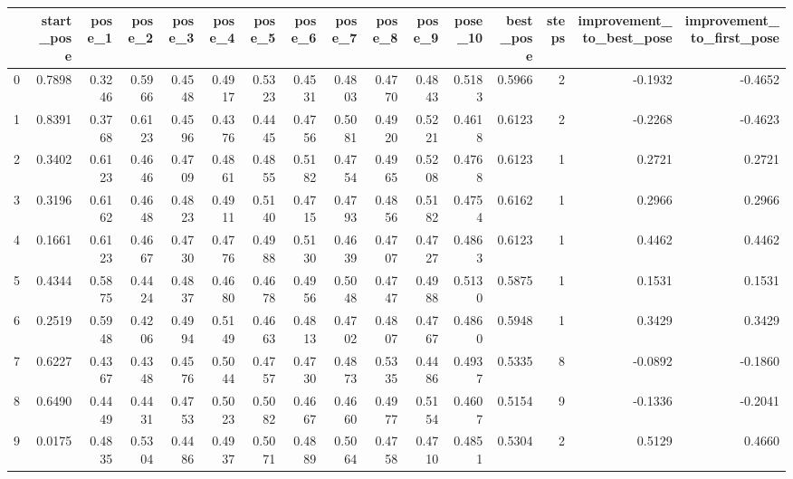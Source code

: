 \begin{tabular}{lrrrrrrrrrrrrrrr}
\toprule
{} &  start\_pose &  pose\_1 &  pose\_2 &  pose\_3 &  pose\_4 &  pose\_5 &  pose\_6 &  pose\_7 &  pose\_8 &  pose\_9 &  pose\_10 &  best\_pose &  steps &  improvement\_to\_best\_pose &  improvement\_to\_first\_pose \\
\midrule
0   &      0.7898 &  0.3246 &  0.5966 &  0.4548 &  0.4917 &  0.5323 &  0.4531 &  0.4803 &  0.4770 &  0.4843 &   0.5183 &     0.5966 &      2 &                   -0.1932 &                    -0.4652 \\
1   &      0.8391 &  0.3768 &  0.6123 &  0.4596 &  0.4376 &  0.4445 &  0.4756 &  0.5081 &  0.4920 &  0.5221 &   0.4618 &     0.6123 &      2 &                   -0.2268 &                    -0.4623 \\
2   &      0.3402 &  0.6123 &  0.4646 &  0.4709 &  0.4861 &  0.4855 &  0.5182 &  0.4754 &  0.4965 &  0.5208 &   0.4768 &     0.6123 &      1 &                    0.2721 &                     0.2721 \\
3   &      0.3196 &  0.6162 &  0.4648 &  0.4823 &  0.4911 &  0.5140 &  0.4715 &  0.4793 &  0.4856 &  0.5182 &   0.4754 &     0.6162 &      1 &                    0.2966 &                     0.2966 \\
4   &      0.1661 &  0.6123 &  0.4667 &  0.4730 &  0.4776 &  0.4988 &  0.5130 &  0.4639 &  0.4707 &  0.4727 &   0.4863 &     0.6123 &      1 &                    0.4462 &                     0.4462 \\
5   &      0.4344 &  0.5875 &  0.4424 &  0.4837 &  0.4680 &  0.4678 &  0.4956 &  0.5048 &  0.4747 &  0.4988 &   0.5130 &     0.5875 &      1 &                    0.1531 &                     0.1531 \\
6   &      0.2519 &  0.5948 &  0.4206 &  0.4994 &  0.5149 &  0.4663 &  0.4813 &  0.4702 &  0.4807 &  0.4767 &   0.4860 &     0.5948 &      1 &                    0.3429 &                     0.3429 \\
7   &      0.6227 &  0.4367 &  0.4348 &  0.4576 &  0.5044 &  0.4757 &  0.4730 &  0.4873 &  0.5335 &  0.4486 &   0.4937 &     0.5335 &      8 &                   -0.0892 &                    -0.1860 \\
8   &      0.6490 &  0.4449 &  0.4431 &  0.4753 &  0.5023 &  0.5082 &  0.4667 &  0.4660 &  0.4977 &  0.5154 &   0.4607 &     0.5154 &      9 &                   -0.1336 &                    -0.2041 \\
9   &      0.0175 &  0.4835 &  0.5304 &  0.4486 &  0.4937 &  0.5071 &  0.4889 &  0.5064 &  0.4758 &  0.4710 &   0.4851 &     0.5304 &      2 &                    0.5129 &                     0.4660 \\

\end{tabular}
